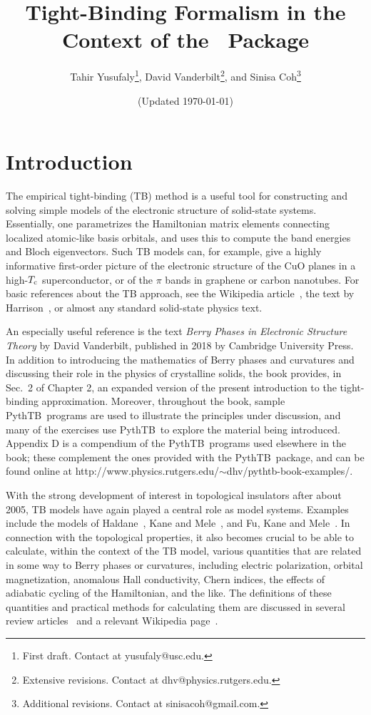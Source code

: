 \documentclass[11pt]{article}
\title{\Large Tight-Binding Formalism in the Context of the \PythTB\ Package}
\author{Tahir Yusufaly\footnote{First draft.  Contact at yusufaly@usc.edu.},
David Vanderbilt\footnote{Extensive revisions.  Contact at
dhv@physics.rutgers.edu.}, and
Sinisa Coh\footnote{Additional revisions.  Contact at
sinisacoh@gmail.com.}
}
\date{(Updated \today)}
\numberwithin{equation}{section} %
\def\PythTB{{\sc PythTB}}
\begin{document}
\maketitle

\section{Introduction}

The empirical tight-binding (TB) method is a useful tool for
constructing and solving simple models of the electronic structure
of solid-state systems.  Essentially, one parametrizes the
Hamiltonian matrix elements connecting localized atomic-like basis orbitals,
and uses this to compute the band energies and Bloch eigenvectors.
Such TB models can, for example, give a highly informative first-order
picture of the electronic structure of the CuO planes in a
high-$T_{\rm c}$ superconductor, or of the $\pi$ bands in
graphene or carbon nanotubes.  For basic references about the
TB approach, see the Wikipedia article~\cite{wiki-tb},
the text by Harrison~\cite{harrison-book},
or almost any standard solid-state physics text.

An especially useful reference is the text \textit{Berry Phases
in Electronic Structure Theory} by David Vanderbilt, published
in 2018 by Cambridge University Press\cite{vanderbilt-book}.
In addition to introducing the mathematics of Berry phases and
curvatures and discussing their role in the physics of crystalline
solids, the book provides, in Sec.~2 of Chapter 2, an expanded
version of the present introduction to the tight-binding approximation.
Moreover, throughout the book, sample \PythTB\ programs are used to
illustrate the principles under discussion, and many of the
exercises use \PythTB\ to explore the
material being introduced. Appendix D is a compendium of the
\PythTB\ programs used elsewhere in the book; these complement
the ones provided with the \PythTB\ package, and can be found online at
http://www.physics.rutgers.edu/$\sim$dhv/pythtb-book-examples/.

With the strong development of interest in topological insulators
after about 2005, TB models have again played a central role as
model systems.  Examples include the models of Haldane~\cite{haldane},
Kane and Mele~\cite{km}, and Fu, Kane and Mele~\cite{fkm}.
In connection with the topological properties, it also becomes
crucial to be able to calculate, within the context of the
TB model, various quantities that are related in some way to
Berry phases or curvatures, including electric polarization,
orbital magnetization, anomalous Hall conductivity, Chern
indices, the effects of adiabatic cycling of the Hamiltonian,
and the like.  The definitions of these quantities and practical
methods for calculating them are discussed in several review
articles~\cite{resta-rmp,vand-resta,xcn,resta-jpcm} and
a relevant Wikipedia page~\cite{wiki-berry}.
\end{document}
